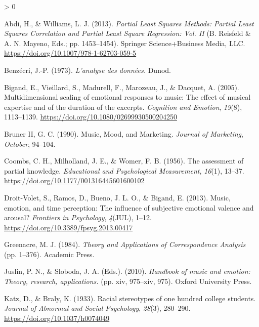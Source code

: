 \documentclass[
  english,
  man,floatsintext]{apa6}
\newlength{\cslhangindent}
\newenvironment{CSLReferences}[2] %
 {%
  \setlength{\parindent}{0pt}
  \ifodd #1 \everypar{\setlength{\hangindent}{\cslhangindent}}\ignorespaces\fi
  \ifnum #2 > 0
  \setlength{\parskip}{#2\baselineskip}
  \fi
 }%
 {}
\begin{document}
\hypertarget{refs}{}
\begin{CSLReferences}{1}{0}
\leavevmode\hypertarget{ref-Abdi2013a}{}%
Abdi, H., \& Williams, L. J. (2013). \emph{{Partial Least Squares Methods: Partial Least Squares Correlation and Partial Least Square Regression}: Vol. II} (B. Reisfeld \& A. N. Mayeno, Eds.; pp. 1453--1454). Springer Science+Business Media, LLC. \url{https://doi.org/10.1007/978-1-62703-059-5}

\leavevmode\hypertarget{ref-Benzecri1973}{}%
Benzécri, J.-P. (1973). \emph{{L'analyse des données.}} Dunod.

\leavevmode\hypertarget{ref-Bigand2005}{}%
Bigand, E., Vieillard, S., Madurell, F., Marozeau, J., \& Dacquet, A. (2005). {Multidimensional scaling of emotional responses to music: The effect of musical expertise and of the duration of the excerpts}. \emph{Cognition and Emotion}, \emph{19}(8), 1113--1139. \url{https://doi.org/10.1080/02699930500204250}

\leavevmode\hypertarget{ref-BrunerII1990}{}%
Bruner II, G. C. (1990). {Music, Mood, and Marketing}. \emph{Journal of Marketing}, \emph{October}, 94--104.

\leavevmode\hypertarget{ref-Coombs1956}{}%
Coombs, C. H., Milholland, J. E., \& Womer, F. B. (1956). {The assessment of partial knowledge}. \emph{Educational and Psychological Measurement}, \emph{16}(1), 13--37. \url{https://doi.org/10.1177/001316445601600102}

\leavevmode\hypertarget{ref-Droit-Volet2013}{}%
Droit-Volet, S., Ramos, D., Bueno, J. L. O., \& Bigand, E. (2013). {Music, emotion, and time perception: The influence of subjective emotional valence and arousal?} \emph{Frontiers in Psychology}, \emph{4}(JUL), 1--12. \url{https://doi.org/10.3389/fpsyg.2013.00417}

\leavevmode\hypertarget{ref-Greenacre1984}{}%
Greenacre, M. J. (1984). \emph{{Theory and Applications of Correspondence Analysis}} (pp. 1--376). Academic Press.

\leavevmode\hypertarget{ref-Juslin2010}{}%
Juslin, P. N., \& Sloboda, J. A. (Eds.). (2010). \emph{{Handbook of music and emotion: Theory, research, applications.}} (pp. xiv, 975--xiv, 975). Oxford University Press.

\leavevmode\hypertarget{ref-Katz1933}{}%
Katz, D., \& Braly, K. (1933). {Racial stereotypes of one hundred college students}. \emph{Journal of Abnormal and Social Psychology}, \emph{28}(3), 280--290. \url{https://doi.org/10.1037/h0074049}


\end{CSLReferences}
\end{document}
